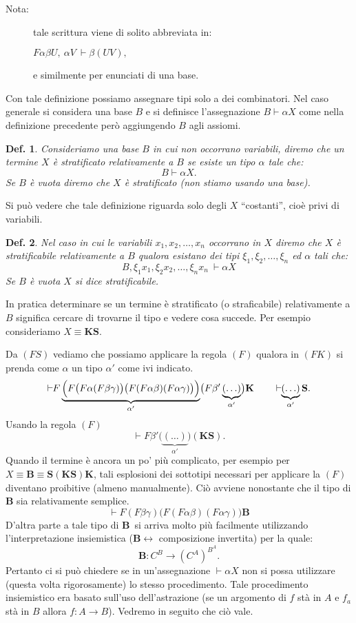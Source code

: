 \documentclass{book}
\newtheorem{definizione}{Def.}[chapter]
\newcommand*{\BB}{$\mathbf{B}$}    %
\newcommand*{\kk}{\mathbf{K}}    %
\newcommand*{\sss}{\mathbf{S}}   %
\newcommand*{\bb}{\mathbf{B}}    %
\newcommand*{\asse}{\vdash\!\!           }
\begin{document}
\begin{description}
\item[Nota: ]tale scrittura viene di solito abbreviata in:

$
F\alpha\beta U,\ \alpha V\ \asse \beta(UV),
$

e similmente per enunciati di una base.
\end{description}

Con tale definizione possiamo assegnare tipi solo a dei combinatori. Nel caso
generale si considera una base $B$ e si definisce l'assegnazione 
$B \asse \alpha X$ come nella definizione precedente per\`o aggiungendo 
$B$ agli assiomi.

\begin{definizione}
Consideriamo una base $B$ in cui non occorrano variabili, diremo che un termine
$X$ \`e \emph{stratificato relativamente} a $B$ se esiste un tipo $\alpha$ tale
che:
\[
B \asse \alpha X.
\]
Se $B$ \`e vuota diremo che $X$ \`e \emph{stratificato} (non stiamo usando una 
base).
\end{definizione}
Si pu\`o vedere che tale definizione riguarda solo degli $X$ ``costanti'', 
cio\`e privi di variabili.

\begin{definizione}
Nel caso in cui le variabili $x_1, x_2, \ldots, x_n$ occorrano in $X$ diremo
che $X$ \`e stratificabile relativamente a $B$ qualora esistano dei tipi
$\xi_1, \xi_2, \ldots, \xi_n$ ed $\alpha$ tali che:
\[
B, \xi_1x_1, \xi_2x_2, \ldots, \xi_nx_n\ \asse \alpha X
\]
Se $B$ \`e vuota $X$ si dice \emph{stratificabile}.
\end{definizione}

In pratica determinare se un termine \`e stratificato (o straficabile) 
relativamente a $B$  significa cercare di trovarne il tipo e vedere cosa 
succede. Per esempio consideriamo $X \equiv \kk \sss$.

Da $(FS)$ vediamo che possiamo applicare la regola $(F)$ qualora in $(FK)$ si
prenda come $\alpha$ un tipo $\alpha'$ come ivi indicato.
\[
\asse F\underbrace{\Bigl(F\bigl(F\alpha(F\beta\gamma)\bigr)
\bigl(F(F\alpha\beta)(F\alpha\gamma)\bigr)\Bigr)}_{\alpha'} \bigl(F\beta'
\underbrace{(\ldots)}_{\alpha'}\bigr)\kk \qquad \asse \underbrace{(\ldots)}
_{\alpha'}\sss .
\]
Usando la regola $(F)$
\[
\asse F\beta'\bigl(\underbrace{(\ldots)}_{\alpha'}\bigr)(\kk\sss).
\]
Quando il termine \`e ancora un po' pi\`u complicato, per esempio per 
$X \equiv \bb \equiv \sss(\kk\sss)\kk$, tali esplosioni dei sottotipi necessari
per applicare la $(F)$ diventano proibitive (almeno manualmente). Ci\`o avviene
nonostante che il tipo di $\bb$ sia relativamente semplice.
\[
\asse F(F\beta\gamma)\bigl(F(F\alpha\beta)(F\alpha\gamma)\bigr)\bb
\]
D'altra parte a tale tipo di \BB~si arriva molto pi\`u facilmente utilizzando 
l'interpretazione insiemistica ($\bb\leftrightarrow$ composizione invertita)
per la quale:
\[
\bb \colon C^B \to (C^A)^{B^A}.
\]
Pertanto ci si pu\`o chiedere se in un'assegnazione $\asse \alpha X$ non si 
possa utilizzare (questa volta rigorosamente) lo stesso procedimento.
Tale procedimento insiemistico era basato sull'uso dell'astrazione (se un 
argomento di $f$ st\`a in $A$ e $f_a$ st\`a in $B$ allora $f\colon A \to B$).
Vedremo in seguito che ci\`o vale.
\end{document}
